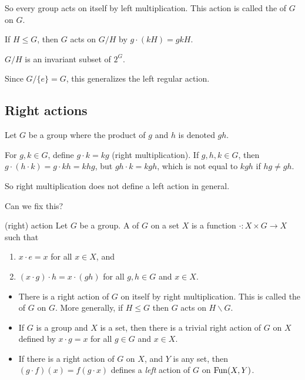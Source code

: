 \documentclass[12pt,letterpaper]{report}
\begin{document}
So every group acts on itself by left multiplication.
This action is called the  of $G$ on $G$.

\begin{lem}{}{}
  If $H \leq G$, then $G$ acts on $G/H$ by $g \cdot (kH) = gkH$.
\end{lem}

\begin{thmproof}
  $G/H$ is an invariant subset of $2^G$.
\end{thmproof}

Since $G/\{e\} = G$, this generalizes the left regular action.

\pagebreak
\subsection{Right actions}

\begin{ex}
  Let $G$ be a group where the product of $g$ and $h$ is denoted $gh$.

  For $g, k \in G$, define $g \cdot k = kg$ (right multiplication).
  If $g, h, k \in G$, then $g \cdot (h \cdot k) = g \cdot kh = khg$, but $gh \cdot k = kgh$, which
  is not equal to $kgh$ if $hg \neq gh$.

  So right multiplication does not define a left action in general.
\end{ex}

Can we fix this?

\begin{defn}{(right) action}{}
  Let $G$ be a group.
  A  of $G$ on a set $X$ is a function $\cdot \colon X \times G \to X$ such
  that
  \begin{enumerate}
    \item $x \cdot e = x$ for all $x \in X$, and
    \item $(x \cdot g) \cdot h = x \cdot (gh)$ for all $g, h \in G$ and $x \in X$.
  \end{enumerate}
\end{defn}

\begin{ex}
  \begin{itemize}
    \item There is a right action of $G$ on itself by right multiplication.
    This is called the  of $G$ on $G$.
    More generally, if $H \leq G$ then $G$ acts on $H \backslash G$.
    \item If $G$ is a group and $X$ is a set, then there is a trivial right action of $G$ on $X$
    defined by $x \cdot g = x$ for all $g \in G$ and $x \in X$.
    \item If there is a right action of $G$ on $X$, and $Y$ is any set, then
    $(g \cdot f)(x) = f(g \cdot x)$ defines a \emph{left} action of $G$ on $\operatorname{Fun}(X, Y)$.
  \end{itemize}
\end{ex}
\end{document}
